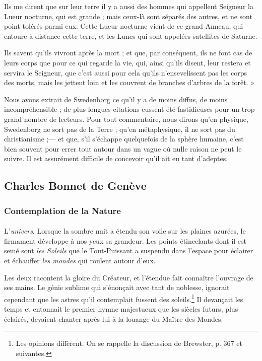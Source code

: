 \documentclass[a4paper, 11pt, oneside, landscape]{article}
\begin{document}
Ils me dirent que sur leur terre il y a aussi des hommes qui appellent Seigneur la Lueur nocturne, qui est grande ; mais ceux-là sont séparés des autres, et ne sont point tolérés parmi eux. Cette Lueur nocturne vient de ce grand Anneau, qui entoure à distance cette terre, et les Lunes qui sont appelées satellites de Saturne.

Ils savent qu'ils vivront après la mort ; et que, par conséquent, ils ne font cas de leurs corps que pour ce qui regarde la vie, qui, ainsi qu'ils disent, leur restera et servira le Seigneur, que c'est aussi pour cela qu'ils n'ensevelissent pas les corps des morts, mais les jettent loin et les couvrent de branches d'arbres de la forêt. »

Nous avons extrait de Swedenborg ce qu'il y a de moins diffus, de moins incompréhensible ; de plus longues citations eussent été fastidieuses pour un trop grand nombre de lecteurs. Pour tout commentaire, nous dirons qu'en physique, Swedenborg ne sort pas de la Terre ; qu'en métaphysique, il ne sort pas du christianisme ;--- et que, s'il s'échappe quelquefois de la sphère humaine, c'est bien souvent pour errer tout autour dans un vague où nulle raison ne peut le suivre. Il est assurément difficile de concevoir qu'il ait eu tant d'adeptes.
\clearpage
\subsection{Charles Bonnet de Genève}
\subsubsection{Contemplation de la Nature}
\paragraph{}
L'\emph{univers}. Lorsque la sombre nuit a étendu son voile sur les plaines azurées, le firmament développe à nos yeux sa grandeur. Les points étincelants dont il est semé sont \emph{les Soleils} que le Tout-Puissant a suspendu dans l'espace pour éclairer et échauffer \emph{les mondes} qui roulent autour d'eux.

Les deux racontent la gloire du Créateur, et l'étendue fait connaître l'ouvrage de ses mains. Le génie sublime qui s'énonçait avec tant de noblesse, ignorait cependant que les astres qu'il contemplait fussent des soleils.\footnote{Les opinions diffèrent. On se rappelle la discussion de Brewster, p. 367 et suivantes.} Il devançait les temps et entonnait le premier hymne majestueux que les siècles futurs, plus éclairés, devaient chanter après lui à la louange du Maître des Mondes.
\end{document}
